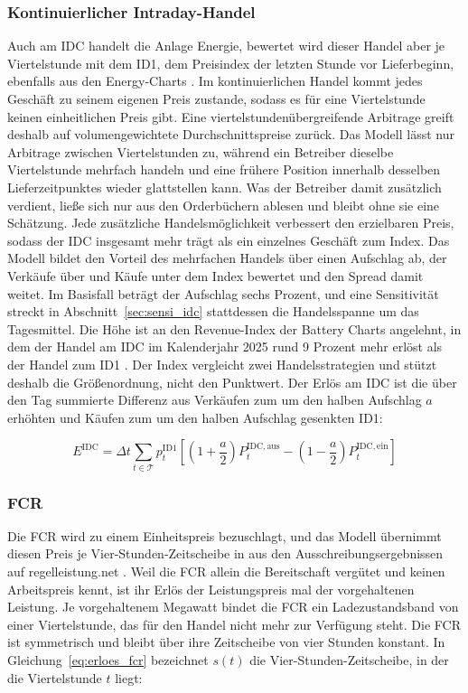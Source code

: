 \subsubsection*{Kontinuierlicher Intraday-Handel}
Auch am \ac{IDC} handelt die Anlage Energie, bewertet wird dieser Handel aber je Viertelstunde mit dem \ac{ID1}, dem Preisindex der letzten Stunde vor Lieferbeginn, ebenfalls aus den Energy-Charts \cite{energy_charts_strompreise_2026}.
Im kontinuierlichen Handel kommt jedes Geschäft zu seinem eigenen Preis zustande, sodass es für eine Viertelstunde keinen einheitlichen Preis gibt.
Eine viertelstundenübergreifende Arbitrage greift deshalb auf volumengewichtete Durchschnittspreise zurück.
Das Modell lässt nur Arbitrage zwischen Viertelstunden zu, während ein Betreiber dieselbe Viertelstunde mehrfach handeln und eine frühere Position innerhalb desselben Lieferzeitpunktes wieder glattstellen kann.
Was der Betreiber damit zusätzlich verdient, ließe sich nur aus den Orderbüchern ablesen und bleibt ohne sie eine Schätzung.
Jede zusätzliche Handelsmöglichkeit verbessert den erzielbaren Preis, sodass der \ac{IDC} insgesamt mehr trägt als ein einzelnes Geschäft zum Index.
Das Modell bildet den Vorteil des mehrfachen Handels über einen Aufschlag ab, der Verkäufe über und Käufe unter dem Index bewertet und den Spread damit weitet.
Im Basisfall beträgt der Aufschlag sechs Prozent, und eine Sensitivität streckt in Abschnitt~\ref{sec:sensi_idc} stattdessen die Handelsspanne um das Tagesmittel.
Die Höhe ist an den Revenue-Index der Battery Charts angelehnt, in dem der Handel am \ac{IDC} im Kalenderjahr 2025 rund 9 Prozent mehr erlöst als der Handel zum \ac{ID1} \cite{isea_batterycharts_2026}.
Der Index vergleicht zwei Handelsstrategien und stützt deshalb die Größenordnung, nicht den Punktwert.
Der Erlös am \ac{IDC} ist die über den Tag summierte Differenz aus Verkäufen zum um den halben Aufschlag $a$ erhöhten und Käufen zum um den halben Aufschlag gesenkten \ac{ID1}:

\begin{equation}
    \label{eq:erloes_idc}
    E^{\mathrm{IDC}} = \Delta t \sum_{t \in \mathcal{T}} p^{\mathrm{ID1}}_t \left[ \left( 1 + \frac{a}{2} \right) P^{\mathrm{IDC,aus}}_t - \left( 1 - \frac{a}{2} \right) P^{\mathrm{IDC,ein}}_t \right]
\end{equation}

\subsubsection*{\acs{FCR}}
Die \ac{FCR} wird zu einem Einheitspreis bezuschlagt, und das Modell übernimmt diesen Preis je Vier-Stunden-Zeitscheibe in \EurMWh{} aus den Ausschreibungsergebnissen auf regelleistung.net \cite{regelleistung_ausschreibungsdaten_2026}.
Weil die \ac{FCR} allein die Bereitschaft vergütet und keinen Arbeitspreis kennt, ist ihr Erlös der Leistungspreis mal der vorgehaltenen Leistung.
Je vorgehaltenem Megawatt bindet die \ac{FCR} ein Ladezustandsband von einer Viertelstunde, das für den Handel nicht mehr zur Verfügung steht.
Die \ac{FCR} ist symmetrisch und bleibt über ihre Zeitscheibe von vier Stunden konstant.
In Gleichung~\ref{eq:erloes_fcr} bezeichnet $s(t)$ die Vier-Stunden-Zeitscheibe, in der die Viertelstunde $t$ liegt:

